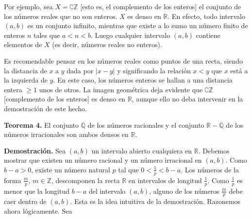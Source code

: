 \documentclass[12pt,oneside]{book}
\begin{document}
Por ejemplo, sea \( X = \complement \mathbb{Z} \) [esto es, el complemento de los enteros] el conjunto de los números reales que no son enteros. \( X \) es denso en \( \mathbb{R} \). En efecto, todo intervalo \( (a, b) \) es un conjunto infinito, mientras que existe a lo sumo un número finito de enteros \( n \) tales que \( a < n < b \). Luego cualquier intervalo \( (a, b) \) contiene elementos de \( X \) (es decir, números reales no enteros).

\begin{center}
\end{center}

Es recomendable pensar en los números reales como puntos de una recta, siendo la distancia de \(x\) a \(y\) dada por \(|x-y|\) y significando la relación \(x < y\) que \(x\) está a la izquierda de \(y\). En este caso, los números enteros se hallan a una distancia entera \(\geq 1\) unos de otros. La imagen geométrica deja evidente que \(\complement\mathbb{Z}\) [complemento de los enteros] es denso en \(\mathbb{R}\), aunque ello no deba intervenir en la demostración de este hecho.

\textbf{Teorema 4.} El conjunto \(\mathbb{Q}\) de los números racionales y el conjunto \(\mathbb{R} - \mathbb{Q}\) de los números irracionales son ambos densos en \(\mathbb{R}\).

\textbf{Demostración.} Sea \((a, b)\) un intervalo abierto cualquiera en \(\mathbb{R}\). Debemos mostrar que existen un número racional y un número irracional en \((a, b)\). Como \(b - a > 0\), existe un número natural \(p\) tal que \(0 < \frac{1}{p} < b - a\). Los números de la forma \(\frac{m}{p}\), \(m \in \mathbb{Z}\), descomponen la recta \(\mathbb{R}\) en intervalos de longitud \(\frac{1}{p}\). Como \(\frac{1}{p}\) es menor que la longitud \(b - a\) del intervalo \((a, b)\), alguno de los números \(\frac{m}{p}\) debe caer dentro de \((a, b)\). Esta es la idea intuitiva de la demostración. Razonemos ahora lógicamente. Sea
\end{document}
